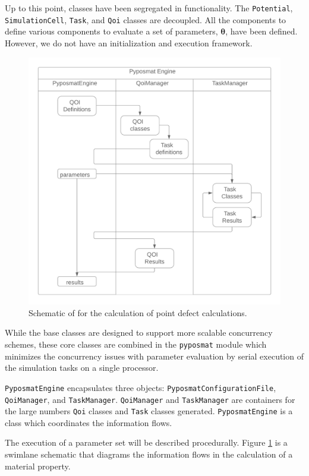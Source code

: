 Up to this point, classes have been segregated in functionality.  The \verb|Potential|, \verb|SimulationCell|, \verb|Task|, and \verb|Qoi| classes are decoupled.  All the components to define various components to evaluate a set of parameters, $\bm{\theta}$, have been defined.  However, we do not have an initialization and execution framework.
\begin{figure}[!htbp]
	\centering
	\includegraphics[width=5in]{chapter6/img/pypospack_coordination}
	\caption{Schematic of for the calculation of point defect calculations.}
	\label{fig:pypospack_coordination}
\end{figure}

While the base classes are designed to support more scalable concurrency schemes, these core classes are combined in the \verb|pyposmat| module which minimizes the concurrency issues with parameter evaluation by serial execution of the simulation tasks on a single processor.

\verb|PyposmatEngine| encapsulates three objects: \verb|PyposmatConfigurationFile|, \verb|QoiManager|, and \verb|TaskManager|.
\verb|QoiManager| and \verb|TaskManager| are containers for the large numbers \verb|Qoi| classes and \verb|Task| classes generated.    \verb|PyposmatEngine| is a class which coordinates the information flows.

The execution of a parameter set will be described procedurally.  Figure \ref{fig:pypospack_coordination} is a swimlane schematic that diagrams the information flows in the calculation of a material property.

